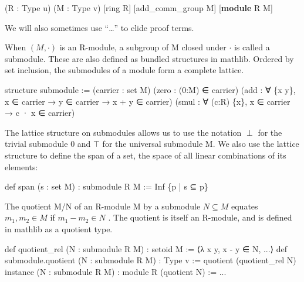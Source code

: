 \documentclass[
]{article}
\newenvironment{Shaded}{}{}
\newcommand{\DataTypeTok}[1]{\textcolor[rgb]{0.56,0.13,0.00}{#1}}
\newcommand{\KeywordTok}[1]{\textcolor[rgb]{0.00,0.44,0.13}{\textbf{#1}}}
\newcommand{\NormalTok}[1]{#1}
\begin{document}
\begin{Shaded}
\begin{Highlighting}[]
\NormalTok{(R : }\DataTypeTok{Type}\NormalTok{ u) (M : }\DataTypeTok{Type}\NormalTok{ v) [ring R]}
\NormalTok{[add\_comm\_group M] [}\KeywordTok{module}\NormalTok{ R M] }
\end{Highlighting}
\end{Shaded}

We will also sometimes use ``\ldots'' to elide proof terms.

When \((M,\cdot)\) is an R-module, a subgroup of M closed under
\(\cdot\) is called a submodule. These are also defined as bundled
structures in mathlib. Ordered by set inclusion, the submodules of a
module form a complete lattice.

\begin{Shaded}
\begin{Highlighting}[]
\NormalTok{structure submodule :=}
\NormalTok{(carrier : set M)}
\NormalTok{(zero : (0:M) ∈ carrier)}
\NormalTok{(add : ∀ \{x y\}, x ∈ carrier →}
\NormalTok{    y ∈ carrier → x + y ∈ carrier)}
\NormalTok{(smul : ∀ (c:R) \{x\},}
\NormalTok{    x ∈ carrier → c · x ∈ carrier) }
\end{Highlighting}
\end{Shaded}

The lattice structure on submodules allows us to use the notation
\(\perp\) for the trivial submodule 0 and \(\top\) for the universal
submodule M. We also use the lattice structure to define the span of a
set, the space of all linear combinations of its elements:

\begin{Shaded}
\begin{Highlighting}[]
\NormalTok{def span (s : set M) : submodule R M := Inf \{p | s ⊆ p\} }
\end{Highlighting}
\end{Shaded}

The quotient M/N of an R-module M by a submodule \(N \subseteq M\)
equates \(m_{1}, m_{2} \in M\) if \(m_{1} - m_{2} \in N\) . The quotient
is itself an R-module, and is defined in mathlib as a quotient type.

\begin{Shaded}
\begin{Highlighting}[]
\NormalTok{def quotient\_rel (N : submodule R M) :}
\NormalTok{    setoid M := ⟨λ x y, x {-} y ∈ N, ...⟩}
\NormalTok{def submodule.quotient (N : submodule R M) :}
\NormalTok{    Type v := quotient (quotient\_rel N)}
\NormalTok{instance (N : submodule R M) :}
\NormalTok{    module R (quotient N) := ... }
\end{Highlighting}
\end{Shaded}
\end{document}
